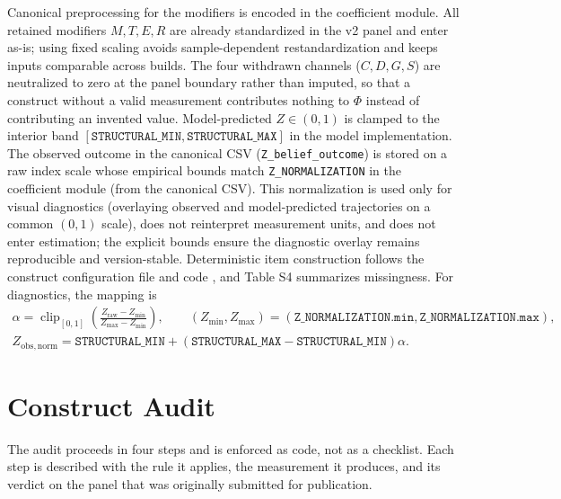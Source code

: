 \documentclass[11pt]{article}
\begin{document}
Canonical preprocessing for the modifiers is encoded in the coefficient module. All retained modifiers $M,T,E,R$ are already standardized in the v2 panel and enter as-is; using fixed scaling avoids sample-dependent restandardization and keeps inputs comparable across builds. The four withdrawn channels ($C,D,G,S$) are neutralized to zero at the panel boundary rather than imputed, so that a construct without a valid measurement contributes nothing to $\Phi$ instead of contributing an invented value. Model-predicted $Z\in(0,1)$ is clamped to the interior band $[\texttt{STRUCTURAL\_MIN},\texttt{STRUCTURAL\_MAX}]$ in the model implementation. The observed outcome in the canonical CSV (\texttt{Z\_belief\_outcome}) is stored on a raw index scale whose empirical bounds match \texttt{Z\_NORMALIZATION} in the coefficient module (from the canonical CSV). This normalization is used only for visual diagnostics (overlaying observed and model-predicted trajectories on a common $(0,1)$ scale), does not reinterpret measurement units, and does not enter estimation; the explicit bounds ensure the diagnostic overlay remains reproducible and version-stable. Deterministic item construction follows the construct configuration file and code \parencite{Nardo2005CompositeIndicators,WVS2022Wave7,WVS_TimeSeries_1981_2022,Peng2011Reproducible}, and Table S4 summarizes missingness. For diagnostics, the mapping is
{\setlength{\abovedisplayskip}{4pt}\setlength{\belowdisplayskip}{4pt}\setlength{\abovedisplayshortskip}{4pt}\setlength{\belowdisplayshortskip}{4pt}%
\begin{equation*}
\begin{gathered}
\alpha = \operatorname{clip}_{[0,1]}\!\left(\frac{Z_{\mathrm{raw}}-Z_{\min}}{Z_{\max}-Z_{\min}}\right),
\qquad (Z_{\min},Z_{\max})=(\texttt{Z\_NORMALIZATION.min},\texttt{Z\_NORMALIZATION.max}),\\
Z_{\mathrm{obs,norm}} = \texttt{STRUCTURAL\_MIN}+(\texttt{STRUCTURAL\_MAX}-\texttt{STRUCTURAL\_MIN})\alpha.
\end{gathered}
\end{equation*}
}
\section{Construct Audit}\label{sec:construct-audit}
The audit proceeds in four steps and is enforced as code, not as a checklist. Each step is described with the rule it applies, the measurement it produces, and its verdict on the panel that was originally submitted for publication.
\end{document}
